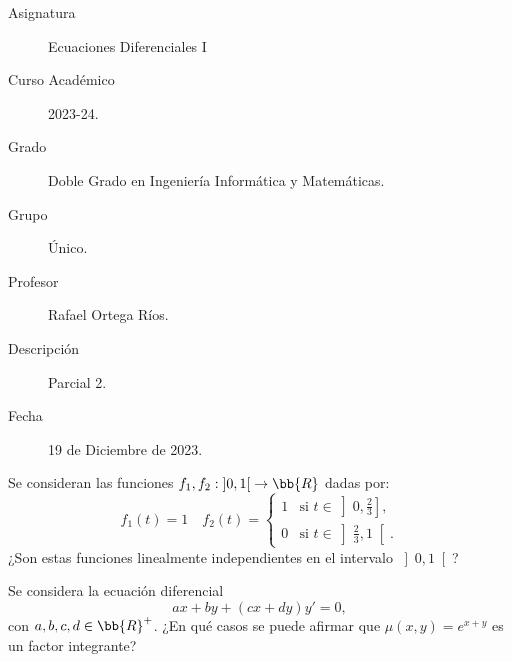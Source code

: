 \documentclass[12pt]{article}
\begin{document}

    
    

    \begin{description}
        \item[Asignatura] Ecuaciones Diferenciales I
        \item[Curso Académico] 2023-24.
        \item[Grado] Doble Grado en Ingeniería Informática y Matemáticas.
        \item[Grupo] Único.
        \item[Profesor] Rafael Ortega Ríos.
        \item[Descripción] Parcial 2.
        \item[Fecha] 19 de Diciembre de 2023.
    
    \end{description}
    \newpage

    \begin{ejercicio}
        Se consideran las funciones $f_1, f_2: \left]0, 1\right[ \to \bb{R}$ dadas por:
        \begin{equation*}
            f_1(t) = 1
            \quad f_2(t) = \begin{cases}
                1 & \text{si } t \in \left]0, \frac{2}{3}\right],\\
                0 & \text{si } t \in \left]\frac{2}{3}, 1\right[.
            \end{cases}
        \end{equation*}
        ¿Son estas funciones linealmente independientes en el intervalo $\left]0, 1\right[$?
    \end{ejercicio}

    \begin{ejercicio}
        Se considera la ecuación diferencial
        \begin{equation*}
            ax + by + (cx + dy)y' = 0,
        \end{equation*}
        con $a, b, c, d \in \bb{R}^+$. ¿En qué casos se puede afirmar que $\mu(x, y) = e^{x+y}$ es un factor integrante?
    \end{ejercicio}
\end{document}
